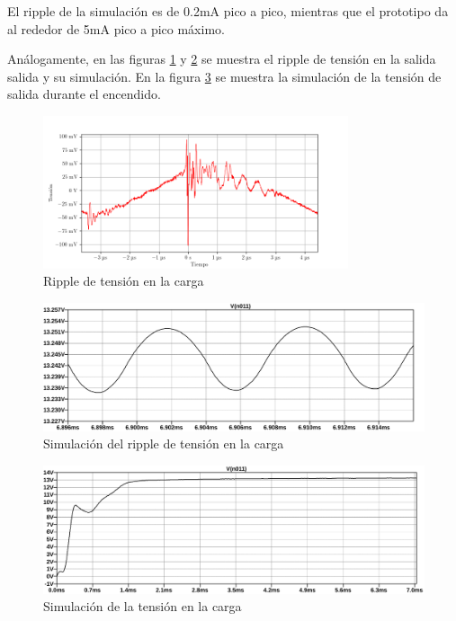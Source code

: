 El ripple de la simulación es de 0.2mA pico a pico, mientras que el prototipo da al rededor de 5mA pico a pico máximo.

Análogamente, en las figuras \ref{fig:osc:58} y \ref{fig:sim:21ripple} se muestra el ripple de tensión en la salida salida y su simulación. En la figura \ref{fig:sim:21} se muestra la simulación de la tensión de salida durante el encendido.

\begin{figure}[H]
    \centering
    \includegraphics[width=0.8\textwidth]{images/capturas-osciloscopio/17-11-2022/58.png}
    \caption{Ripple de tensión en la carga}
    \label{fig:osc:58}
\end{figure}

\begin{figure}[H]
    \centering
    \includegraphics[width=\textwidth]{images/sim/21-ripple.pdf}
    \caption{Simulación del ripple de tensión en la carga}
    \label{fig:sim:21ripple}
\end{figure}

\begin{figure}[H]
    \centering
    \includegraphics[width=\textwidth]{images/sim/21.pdf}
    \caption{Simulación de la tensión en la carga}
    \label{fig:sim:21}
\end{figure}

